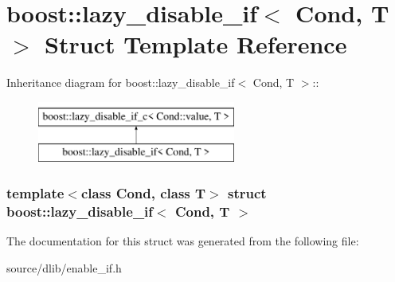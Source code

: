 \hypertarget{structboost_1_1lazy__disable__if}{
\section{boost::lazy\_\-disable\_\-if$<$ Cond, T $>$ Struct Template Reference}
\label{structboost_1_1lazy__disable__if}
}
Inheritance diagram for boost::lazy\_\-disable\_\-if$<$ Cond, T $>$::\begin{figure}[H]
\begin{center}
\leavevmode
\includegraphics[height=2cm]{structboost_1_1lazy__disable__if}
\end{center}
\end{figure}
\subsubsection*{template$<$class Cond, class T$>$ struct boost::lazy\_\-disable\_\-if$<$ Cond, T $>$}



The documentation for this struct was generated from the following file:\begin{DoxyCompactItemize}
\item 
source/dlib/enable\_\-if.h\end{DoxyCompactItemize}
